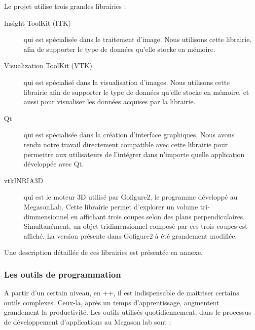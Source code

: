 Le projet utilise trois grandes librairies :
\begin{description}
  \item[Insight ToolKit (ITK)] qui est spécialisée dans le traitement d'image. Nous utilisons cette librairie, 
  afin de supporter le type de données qu'elle stocke en mémoire.
  \item[Visualization ToolKit (VTK)] qui est spécialisé dans la visualisation d'images. 
  Nous utilisons cette librairie afin de supporter le type de données qu'elle stocke en mémoire,
  et aussi pour visualiser les données acquises par la librairie.
  \item[Qt]\cite{refQT} qui est spécialisée dans la création d'interface graphiques. 
  Nous avons rendu notre travail directement compatible avec cette librairie
  pour permettre aux utilisateurs de l'intégrer dans n'importe quelle application développée avec Qt.
  \item[vtkINRIA3D]{\cite{vtkINRIA}} qui est le moteur 3D utilisé par Gofigure2\cite{refGofigure2},
  le programme développé au MegasonLab.
  Cette librairie permet d'explorer un volume tri-dimmensionnel en affichant trois coupes selon des plans perpendiculaires.
  Simultanément, un objet tridimensionnel composé par ces trois coupes est affiché.
  La version présente dans Gofigure2 à été grandement modifiée.
\end{description}
Une description détaillée de ces librairies est présentée en annexe.


\subsubsection{Les outils de programmation}
A partir d'un certain niveau, en {\C++}, il est indispensable de maitriser certains outils complexes. Ceux-la, après un temps
 d'apprentissage, augmentent grandement la productivité.
Les outils utilisés quotidiennement, dans le processus de développement d'applications au Megason lab sont :

